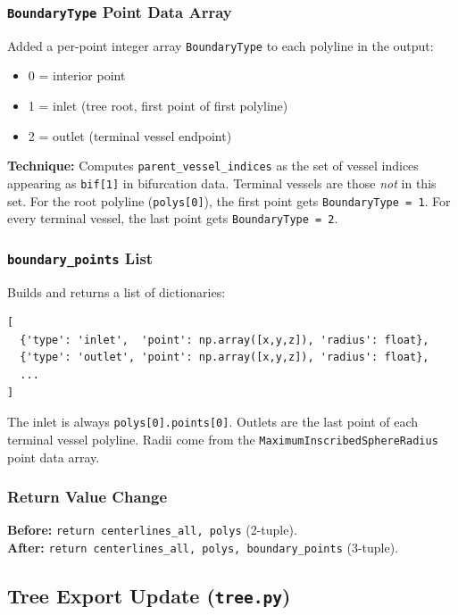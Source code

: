 \documentclass[11pt,a4paper]{article}
\begin{document}
\subsubsection{\texttt{BoundaryType} Point Data Array}

Added a per-point integer array \texttt{BoundaryType} to each polyline in the output:
\begin{itemize}[nosep]
    \item 0 = interior point
    \item 1 = inlet (tree root, first point of first polyline)
    \item 2 = outlet (terminal vessel endpoint)
\end{itemize}

\textbf{Technique:} Computes \texttt{parent\_vessel\_indices} as the set of vessel indices appearing as \texttt{bif[1]} in bifurcation data. Terminal vessels are those \emph{not} in this set. For the root polyline (\texttt{polys[0]}), the first point gets \texttt{BoundaryType = 1}. For every terminal vessel, the last point gets \texttt{BoundaryType = 2}.

\subsubsection{\texttt{boundary\_points} List}

Builds and returns a list of dictionaries:
\begin{lstlisting}
[
  {'type': 'inlet',  'point': np.array([x,y,z]), 'radius': float},
  {'type': 'outlet', 'point': np.array([x,y,z]), 'radius': float},
  ...
]
\end{lstlisting}

The inlet is always \texttt{polys[0].points[0]}. Outlets are the last point of each terminal vessel polyline. Radii come from the \texttt{MaximumInscribedSphereRadius} point data array.

\subsubsection{Return Value Change}

\textbf{Before:} \texttt{return centerlines\_all, polys} (2-tuple).\\
\textbf{After:} \texttt{return centerlines\_all, polys, boundary\_points} (3-tuple).

\subsection{Tree Export Update (\texttt{tree.py})}
\end{document}
